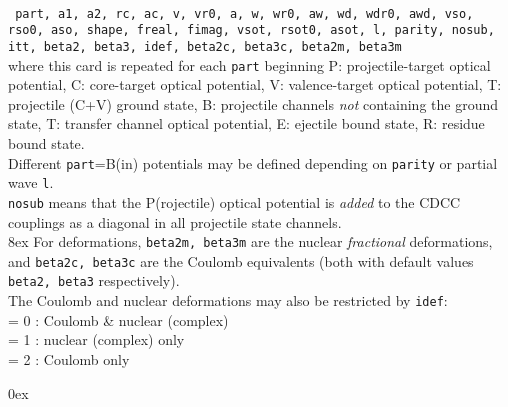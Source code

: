 \documentclass[11pt]{article}
\begin{document}
\\
{\tt
part, a1, a2, rc, ac, v, vr0, a, w, wr0, aw,
wd, wdr0, awd, vso, rso0, aso, shape, freal, fimag,
vsot, rsot0, asot, l, parity, nosub, itt,
beta2, beta3, idef, beta2c, beta3c, beta2m, beta3m
}\\
where this card is repeated for each {\tt part} beginning
P: projectile-target  optical potential, C: core-target optical potential,
V: valence-target  optical potential,
T: projectile (C+V) ground state,
B: projectile channels {\em not} containing the ground state,
T: transfer channel optical potential,
E: ejectile bound state, R: residue bound state.\\
Different {\tt part}=B(in) potentials may be defined depending on {\tt parity}
or partial wave {\tt l}. \\
{\tt nosub} means that the P(rojectile) optical potential is {\em added} to
the CDCC couplings as a diagonal in all projectile state channels.\\

\hangindent 8ex
For deformations, {\tt beta2m, beta3m} are the nuclear {\em fractional}
deformations, and {\tt beta2c, beta3c} are the Coulomb equivalents (both with default
values  {\tt beta2, beta3} respectively).\\
The Coulomb and nuclear deformations may also be restricted by {\tt idef}:
\\   = 0 : Coulomb \& nuclear (complex)
\\  = 1 : nuclear (complex) only
\\  = 2 : Coulomb only

\hangindent 0ex
\end{document}

